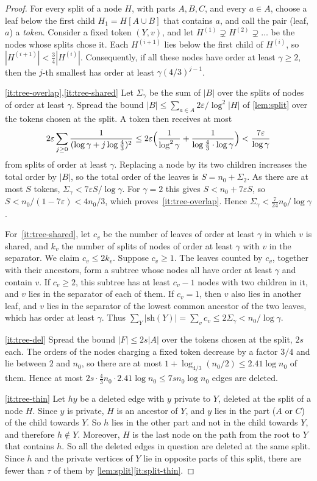 \documentclass[11pt]{article}
\theoremstyle{definition}
\theoremstyle{remark}
\numberwithin{equation}{section}
\numberwithin{figure}{section}
\numberwithin{table}{section}
\newcommand{\eps}{\varepsilon}
\newcommand{\sh}{\mathrm{sh}}
\begin{document}
\begin{proof}
For every split of a node $H$, with parts $A,B,C$, and every $a\in A$, choose a
leaf below the first child $H_1=H[A\cup B]$ that contains $a$, and call the pair (leaf, $a$) a
\emph{token}. Consider a fixed token $(Y,v)$, and let $H^{(1)}\supsetneq
H^{(2)}\supsetneq\dots$ be the nodes whose splits chose it. Each $H^{(i+1)}$
lies below the first child of $H^{(i)}$, so $|H^{(i+1)}|<\frac34|H^{(i)}|$.
Consequently, if all these nodes have order at least $\gamma\ge2$, then the
$j$-th smallest has order at least $\gamma(4/3)^{j-1}$.

\ref{it:tree-overlap},\ref{it:tree-shared} Let $\Sigma_\gamma$ be the sum of
$|B|$ over the splits of nodes of order at least $\gamma$. Spread the bound
$|B|\le\sum_{a\in A}2\eps/\log^2|H|$ of \cref{lem:split} over the tokens chosen
at the split. A token then receives at most
\[
2\eps\sum_{j\ge0}\frac1{(\log\gamma+j\log\frac43)^2}
\le2\eps\Bigl(\frac1{\log^2\gamma}+\frac1{\log\frac43\cdot\log\gamma}\Bigr)
<\frac{7\eps}{\log\gamma}
\]
from splits of order at least $\gamma$. Replacing a node by its two children
increases the total order by $|B|$, so the total order of the leaves is
$S=n_0+\Sigma_2$. As there are at most $S$ tokens,
$\Sigma_\gamma<7\eps S/\log\gamma$. For $\gamma=2$ this gives $S<n_0+7\eps S$,
so $S<n_0/(1-7\eps)<4n_0/3$, which proves~\ref{it:tree-overlap}. Hence
$\Sigma_\gamma<\frac{7}{24}n_0/\log\gamma$.

For~\ref{it:tree-shared}, let $c_v$ be the number of leaves of order at least
$\gamma$ in which $v$ is shared, and $k_v$ the number of splits of nodes of
order at least $\gamma$ with $v$ in the separator. We claim $c_v\le2k_v$.
Suppose $c_v\ge1$. The leaves counted by $c_v$, together with their ancestors,
form a subtree whose nodes all have order at least $\gamma$ and contain $v$. If
$c_v\ge2$, this subtree has at least $c_v-1$ nodes with two children in it, and
$v$ lies in the separator of each of them. If $c_v=1$, then $v$ also lies in
another leaf, and $v$ lies in the separator of the lowest common ancestor of
the two leaves, which has order at least $\gamma$. Thus
$\sum_Y|\sh(Y)|=\sum_vc_v\le2\Sigma_\gamma<n_0/\log\gamma$.

\ref{it:tree-del} Spread the bound $|F|\le2s|A|$ over the tokens chosen at the
split, $2s$ each. The orders of the nodes charging a fixed token decrease by a
factor $3/4$ and lie between $2$ and $n_0$, so there are at most
$1+\log_{4/3}(n_0/2)\le2.41\log n_0$ of them. Hence at most
$2s\cdot\frac43n_0\cdot2.41\log n_0\le7sn_0\log n_0$ edges are deleted.

\ref{it:tree-thin} Let $hy$ be a deleted edge with $y$ private to $Y$, deleted
at the split of a node $H$. Since $y$ is private, $H$ is an ancestor of $Y$, and
$y$ lies in the part ($A$ or $C$) of the child towards $Y$. So $h$ lies in the
other part and not in the child towards $Y$, and therefore $h\notin Y$.
Moreover, $H$ is the last node on the path from the root to $Y$ that contains
$h$. So all the deleted edges in question are deleted at the same split. Since
$h$ and the private vertices of $Y$ lie in opposite parts of this split, there
are fewer than $\tau$ of them by \cref{lem:split}\ref{it:split-thin}.
\end{proof}
\end{document}
